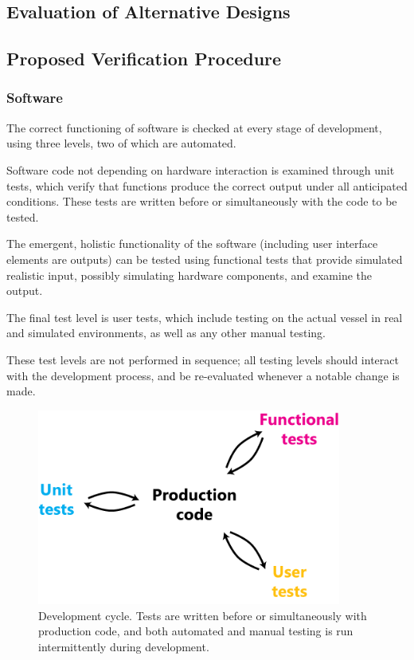 \subsection{\label{sec:method:evaluation-of-alternative-designs}Evaluation of Alternative Designs}

\subsection{\label{sec:method:proposed-verification-procedure}Proposed Verification Procedure}

\subsubsection{\label{sec:method:proposed-verification-procedure:software}Software}
The correct functioning of software is checked at every stage of development, using three levels, two of which are automated.

Software code not depending on hardware interaction is examined through unit tests, which verify that functions produce the correct output under all anticipated conditions. These tests are written before or simultaneously with the code to be tested.

The emergent, holistic functionality of the software (including user interface elements are outputs) can be tested using functional tests that provide simulated realistic input, possibly simulating hardware components, and examine the output.

The final test level is user tests, which include testing on the actual vessel in real and simulated environments, as well as any other manual testing.

These test levels are not performed in sequence; all testing levels should interact with the development process, and be re-evaluated whenever a notable change is made.

\begin{figure}
\includegraphics[width=100mm,natwidth=494,natheight=299]{"./image/software-testing"}
\caption[Software development cycle]{\label{fig:software-testing}Development cycle. Tests are written before or simultaneously with production code, and both automated and manual testing is run intermittently during development.}
\end{figure}

